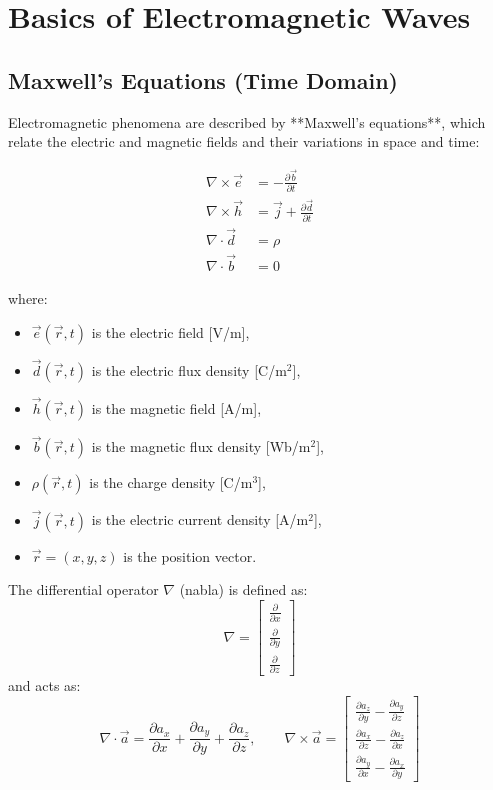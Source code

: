 
\chapter{Basics of Electromagnetic Waves}

\section*{Maxwell’s Equations (Time Domain)}

Electromagnetic phenomena are described by **Maxwell’s equations**, which relate the electric and magnetic fields and their variations in space and time:

\begin{align}
\nabla \times \vec{e} &= - \frac{\partial \vec{b}}{\partial t} \\
\nabla \times \vec{h} &= \vec{j} + \frac{\partial \vec{d}}{\partial t} \\
\nabla \cdot \vec{d} &= \rho \\
\nabla \cdot \vec{b} &= 0
\end{align}

where:
\begin{itemize}
    \item $\vec{e}(\vec{r},t)$ is the electric field [V/m],
    \item $\vec{d}(\vec{r},t)$ is the electric flux density [C/m$^2$],
    \item $\vec{h}(\vec{r},t)$ is the magnetic field [A/m],
    \item $\vec{b}(\vec{r},t)$ is the magnetic flux density [Wb/m$^2$],
    \item $\rho(\vec{r},t)$ is the charge density [C/m$^3$],
    \item $\vec{j}(\vec{r},t)$ is the electric current density [A/m$^2$],
    \item $\vec{r} = (x, y, z)$ is the position vector.
\end{itemize}

\noindent
The differential operator $\nabla$ (nabla) is defined as:
\[
\nabla = 
\begin{bmatrix}
\frac{\partial}{\partial x} \\
\frac{\partial}{\partial y} \\
\frac{\partial}{\partial z}
\end{bmatrix}
\]
and acts as:
\[
\nabla \cdot \vec{a} = 
\frac{\partial a_x}{\partial x} +
\frac{\partial a_y}{\partial y} +
\frac{\partial a_z}{\partial z}, \qquad
\nabla \times \vec{a} = 
\begin{bmatrix}
\frac{\partial a_z}{\partial y} - \frac{\partial a_y}{\partial z} \\
\frac{\partial a_x}{\partial z} - \frac{\partial a_z}{\partial x} \\
\frac{\partial a_y}{\partial x} - \frac{\partial a_x}{\partial y}
\end{bmatrix}
\]

